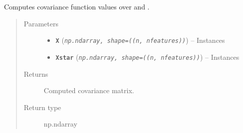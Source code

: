 \documentclass[letterpaper,10pt,english]{sphinxmanual}
\begin{document}
\begin{fulllineitems}
\begin{fulllineitems}
\label{pyGPGO.covfunc:pyGPGO.covfunc.matern.K}
Computes covariance function values over  and .
\begin{quote}\begin{description}
\item[{Parameters}] \leavevmode\begin{itemize}
\item {} 
\textbf{\texttt{X}} (\emph{\texttt{np.ndarray, shape=((n, nfeatures))}}) -- Instances

\item {} 
\textbf{\texttt{Xstar}} (\emph{\texttt{np.ndarray, shape=((n, nfeatures))}}) -- Instances

\end{itemize}

\item[{Returns}] \leavevmode
Computed covariance matrix.

\item[{Return type}] \leavevmode
np.ndarray

\end{description}\end{quote}

\end{fulllineitems}


\end{fulllineitems}

\end{document}
